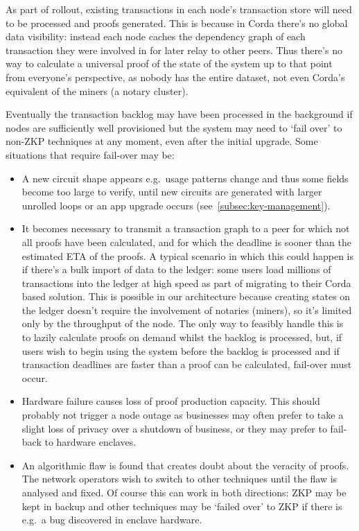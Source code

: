 \documentclass{article}
\begin{document}
As part of rollout, existing transactions in each node's transaction store will need to be processed and proofs
generated. This is because in Corda there's no global data visibility: instead each node caches the dependency
graph of each transaction they were involved in for later relay to other peers. Thus there's no way to calculate
a universal proof of the state of the system up to that point from everyone's perspective, as nobody has the
entire dataset, not even Corda's equivalent of the miners (a notary cluster).

Eventually the transaction backlog may have been processed in the background if nodes are sufficiently well
provisioned but the system may need to `fail over' to non-ZKP techniques at any moment, even after the
initial upgrade. Some situations that require fail-over may be:

\begin{itemize}

    \item A new circuit shape appears e.g.\ usage patterns change and thus some fields become too large to verify,
    until new circuits are generated with larger unrolled loops or an app upgrade occurs
    (see~\cref{subsec:key-management}).

    \item It becomes necessary to transmit a transaction graph to a peer for which not all proofs have been
    calculated, and for which the deadline is sooner than the estimated ETA of the proofs. A typical scenario
    in which this could happen is if there's a bulk import of data to the ledger: some users load millions of
    transactions into the ledger at high speed as part of migrating to their Corda based solution. This is
    possible in our architecture because creating states on the ledger doesn't require the involvement of
    notaries (miners), so it's limited only by the throughput of the node. The only way to feasibly handle this
    is to lazily calculate proofs on demand whilst the backlog is processed, but, if users wish to begin using
    the system before the backlog is processed and if transaction deadlines are faster than a proof can be
    calculated, fail-over must occur.

    \item Hardware failure causes loss of proof production capacity. This should probably not trigger a node
    outage as businesses may often prefer to take a slight loss of privacy over a shutdown of business, or
    they may prefer to fail-back to hardware enclaves.

    \item An algorithmic flaw is found that creates doubt about the veracity of proofs. The network operators
    wish to switch to other techniques until the flaw is analysed and fixed. Of course this can work in
    both directions: ZKP may be kept in backup and other techniques may be `failed over' to ZKP if there is
    e.g.\ a bug discovered in enclave hardware.

\end{itemize}
\end{document}
